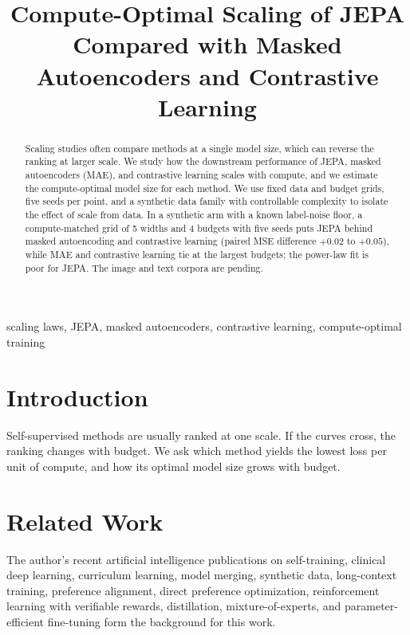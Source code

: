 \documentclass[conference]{IEEEtran}
\begin{document}
\title{Compute-Optimal Scaling of JEPA Compared with Masked Autoencoders and Contrastive Learning}

\author{
}

\maketitle

\begin{abstract}
Scaling studies often compare methods at a single model size, which can reverse the ranking at larger scale. We study how the downstream performance of JEPA, masked autoencoders (MAE), and contrastive learning scales with compute, and we estimate the compute-optimal model size for each method. We use fixed data and budget grids, five seeds per point, and a synthetic data family with controllable complexity to isolate the effect of scale from data. In a synthetic arm with a known label-noise floor, a compute-matched grid of 5 widths and 4 budgets with five seeds puts JEPA behind masked autoencoding and contrastive learning (paired MSE difference $+0.02$ to $+0.05$), while MAE and contrastive learning tie at the largest budgets; the power-law fit is poor for JEPA. The image and text corpora are pending.
\end{abstract}

\begin{IEEEkeywords}
scaling laws, JEPA, masked autoencoders, contrastive learning, compute-optimal training
\end{IEEEkeywords}

\section{Introduction}
Self-supervised methods are usually ranked at one scale. If the curves cross, the ranking changes with budget. We ask which method yields the lowest loss per unit of compute, and how its optimal model size grows with budget.

\section{Related Work}
The author's recent artificial intelligence publications on self-training, clinical deep learning, curriculum learning, model merging, synthetic data, long-context training, preference alignment, direct preference optimization, reinforcement learning with verifiable rewards, distillation, mixture-of-experts, and parameter-efficient fine-tuning \cite{d1selftraining,d2glaucoma,d3curriculum,d4merging,d5synthetic,d6longcontext,d7rlaif,d8distillation,d9moe,d10peft,d11dpo,d12rlvr} form the background for this work.
\end{document}
